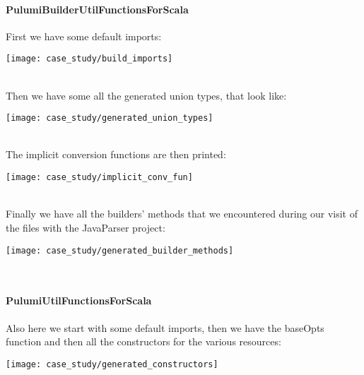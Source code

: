 \paragraph{PulumiBuilderUtilFunctionsForScala}
First we have some default imports:
\begin{center}
  \texttt{[image: case\_study/build\_imports]} 
\end{center}\mbox{}\\
Then we have some all the generated union types, that look like:
\begin{center}
  \hspace*{-3cm}\texttt{[image: case\_study/generated\_union\_types]} 
\end{center}\mbox{}\\
The implicit conversion functions are then printed:
\begin{center}
  \texttt{[image: case\_study/implicit\_conv\_fun]} 
\end{center}\mbox{}\\
Finally we have all the builders' methods that we encountered during our visit of the files with the JavaParser project:
\begin{center}
  \hspace*{-3cm}\texttt{[image: case\_study/generated\_builder\_methods]} 
\end{center}\mbox{}\\

\paragraph{PulumiUtilFunctionsForScala}
Also here we start with some default imports, then we have the baseOpts function and then all the constructors for the various resources:
\begin{center}
  \hspace*{-3cm}\texttt{[image: case\_study/generated\_constructors]} 
\end{center}\mbox{}\\

